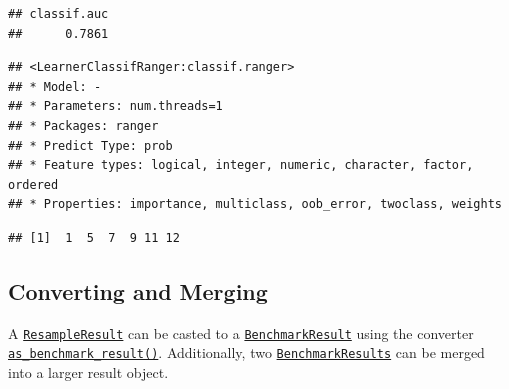 \documentclass[
]{scrbook}
\newenvironment{Shaded}{\begin{snugshade}}{\end{snugshade}}
\newcommand{\CommentTok}[1]{\textcolor[rgb]{0.56,0.35,0.01}{\textit{#1}}}
\newcommand{\FunctionTok}[1]{\textcolor[rgb]{0.00,0.00,0.00}{#1}}
\newcommand{\NormalTok}[1]{#1}
\newcommand{\OtherTok}[1]{\textcolor[rgb]{0.56,0.35,0.01}{#1}}
\newcommand{\SpecialCharTok}[1]{\textcolor[rgb]{0.00,0.00,0.00}{#1}}
\renewenvironment{Shaded} {\begin{snugshade}\small} {\end{snugshade}}
\begin{document}
\begin{verbatim}
## classif.auc 
##      0.7861
\end{verbatim}

\begin{Shaded}
\end{Shaded}

\begin{verbatim}
## <LearnerClassifRanger:classif.ranger>
## * Model: -
## * Parameters: num.threads=1
## * Packages: ranger
## * Predict Type: prob
## * Feature types: logical, integer, numeric, character, factor, ordered
## * Properties: importance, multiclass, oob_error, twoclass, weights
\end{verbatim}

\begin{Shaded}
\end{Shaded}

\begin{verbatim}
## [1]  1  5  7  9 11 12
\end{verbatim}

\hypertarget{converting-and-merging}{%
\subsection{Converting and Merging}\label{converting-and-merging}}

A \href{https://mlr3.mlr-org.com/reference/ResampleResult.html}{\texttt{ResampleResult}} can be casted to a \href{https://mlr3.mlr-org.com/reference/BenchmarkResult.html}{\texttt{BenchmarkResult}} using the converter \href{https://mlr3.mlr-org.com/reference/as_benchmark_result.html}{\texttt{as\_benchmark\_result()}}.
Additionally, two \href{https://mlr3.mlr-org.com/reference/BenchmarkResult.html}{\texttt{BenchmarkResults}} can be merged into a larger result object.
\end{document}
